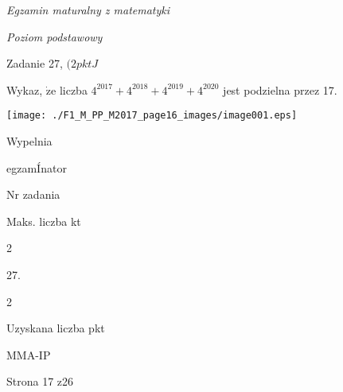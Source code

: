 \documentclass[a4paper,12pt]{article}
\begin{document}
{\it Egzamin maturalny z matematyki}

{\it Poziom podstawowy}

Zadanie 27, $(2pktJ$

Wykaz, $\dot{\mathrm{z}}\mathrm{e}$ liczba $4^{2017}+4^{2018}+4^{2019}+4^{2020}$ jest podzielna przez 17.
\begin{center}
\texttt{[image: ./F1\_M\_PP\_M2017\_page16\_images/image001.eps]}
\end{center}
Wypelnia

egzamÍnator

Nr zadania

Maks. liczba kt

2

27.

2

Uzyskana liczba pkt

MMA-IP

Strona 17 z26
\end{document}
